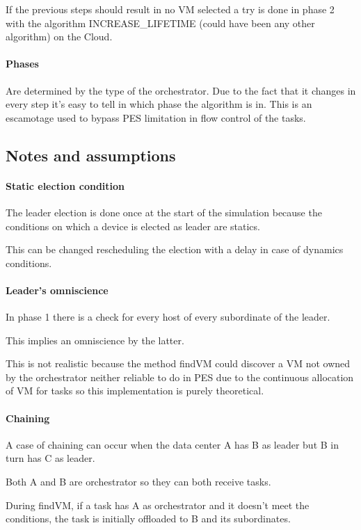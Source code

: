 \documentclass[12pt]{report}
\begin{document}
If the previous steps should result in no VM selected a try is done in phase 2 with the algorithm INCREASE\_LIFETIME (could have been any other algorithm) on the Cloud.\\

\paragraph{Phases}
Are determined by the type of the orchestrator.
Due to the fact that it changes in every step it's easy to tell in which phase the algorithm is in.
This is an escamotage used to bypass PES limitation in flow control of the tasks.\\

\subsection{Notes and assumptions}

\paragraph{Static election condition} The leader election is done once at the start of the simulation because the conditions on which a device is elected as leader are statics.

This can be changed rescheduling the election with a delay in case of dynamics conditions.

\paragraph{Leader's omniscience}
In phase 1 there is a check for every host of every subordinate of the leader.

This implies an omniscience by the latter.

This is not realistic because the method findVM could discover a VM not owned by the orchestrator neither reliable to do in PES due to the continuous allocation of VM for tasks so this implementation is purely theoretical.

\paragraph{Chaining}
A case of chaining can occur when the data center A has B as leader but B in turn has C as leader.

Both A and B are orchestrator so they can both receive tasks.

During findVM, if a task has A as orchestrator and it doesn't meet the conditions, the task is initially offloaded to B and its subordinates.
\end{document}
